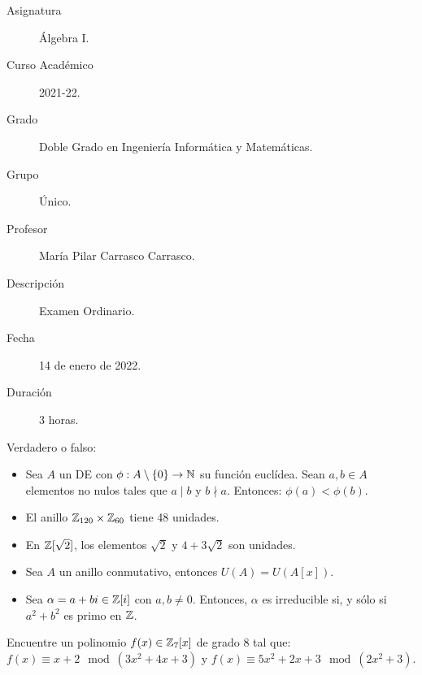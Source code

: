 \documentclass[12pt]{article}
\begin{document}

    
    

    
    \begin{description}
        \item[Asignatura] Álgebra I.
        \item[Curso Académico] 2021-22.
        \item[Grado] Doble Grado en Ingeniería Informática y Matemáticas.
        \item[Grupo] Único.
        \item[Profesor] María Pilar Carrasco Carrasco.
        \item[Descripción] Examen Ordinario.
        \item[Fecha] 14 de enero de 2022.
        \item[Duración] 3 horas.
    
    \end{description}
    \newpage
    
    \begin{ejercicio}
        Verdadero o falso:
        \begin{itemize}
            \item Sea $A$ un DE con $\phi:A\setminus\{0\} \rightarrow \mathbb{N}$ su función euclídea. Sean $a,b \in A$ elementos no nulos tales que $a\mid b$ y $b\nmid a$. Entonces: $\phi(a)<\phi(b)$.
            \item El anillo $\mathbb{Z}_{120} \times \mathbb{Z}_{60}$ tiene 48 unidades.
            \item En $\mathbb{Z}[\sqrt{2}]$, los elementos $\sqrt{2}$ y $4+3\sqrt{2}$ son unidades.
            \item Sea $A$ un anillo conmutativo, entonces $U(A) = U(A[x])$.
            \item Sea $\alpha = a+bi \in \mathbb{Z}[i]$ con $a,b \neq 0$. Entonces, $\alpha$ es irreducible si, y sólo si $a^2 + b^2$ es primo en $\mathbb{Z}$.
        \end{itemize}
    \end{ejercicio}

    \begin{ejercicio}
        Encuentre un polinomio $f(x)\in \mathbb{Z}_7[x]$ de grado $8$ tal que:\newline
        $f(x)\equiv x+2 \mod (3x^2 + 4x + 3)$ y $f(x)\equiv 5x^2 + 2x + 3 \mod (2x^2+3)$.
    \end{ejercicio}
\end{document}
